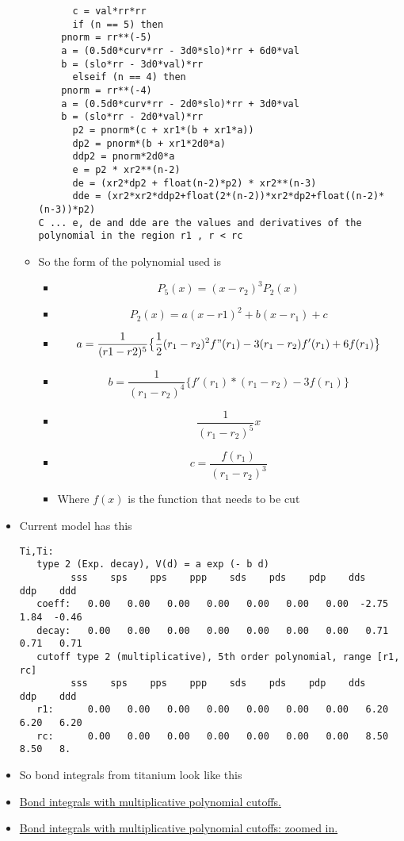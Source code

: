 \documentclass[11pt]{article}
\begin{document}
\begin{itemize}
\begin{itemize}
\begin{verbatim}
      c = val*rr*rr
      if (n == 5) then
	pnorm = rr**(-5)
	a = (0.5d0*curv*rr - 3d0*slo)*rr + 6d0*val
	b = (slo*rr - 3d0*val)*rr
      elseif (n == 4) then
	pnorm = rr**(-4)
	a = (0.5d0*curv*rr - 2d0*slo)*rr + 3d0*val
	b = (slo*rr - 2d0*val)*rr
      p2 = pnorm*(c + xr1*(b + xr1*a))
      dp2 = pnorm*(b + xr1*2d0*a)
      ddp2 = pnorm*2d0*a
      e = p2 * xr2**(n-2)
      de = (xr2*dp2 + float(n-2)*p2) * xr2**(n-3)
      dde = (xr2*xr2*ddp2+float(2*(n-2))*xr2*dp2+float((n-2)*(n-3))*p2)
C ... e, de and dde are the values and derivatives of the polynomial in the region r1 , r < rc
\end{verbatim}
\item So the form of the polynomial used is
\begin{itemize}
\item $$ P_5(x) = (x-r_2)^3 P_2(x)  $$
\item \[ P_2(x) = a(x-r1)^2 + b(x-r_1) + c \]
\item \[ a = \frac{1}{ (r1-r2)^5 } \big\{  \frac{1}{2}(r_1-r_2)^2f"(r_1) -3(r_1-r_2)f'(r_1) + 6f(r_1) \big\} \]
\item \[  b = \frac{1}{(r_1-r_2)^4} \big\{ f'(r_1)*(r_1-r_2) - 3f(r_1) \big\}  \]
\item \[ \frac{1}{(r_1 - r_2)^5} x \]
\item \[  c = \frac{ f(r_1) }{ (r_1-r_2)^3} \]
\item Where $f(x)$ is the function that needs to be cut
\end{itemize}
\end{itemize}
\item Current model has this
\begin{verbatim}
Ti,Ti:
   type 2 (Exp. decay), V(d) = a exp (- b d)
	     sss    sps    pps    ppp    sds    pds    pdp    dds    ddp    ddd
   coeff:   0.00   0.00   0.00   0.00   0.00   0.00   0.00  -2.75   1.84  -0.46
   decay:   0.00   0.00   0.00   0.00   0.00   0.00   0.00   0.71   0.71   0.71
   cutoff type 2 (multiplicative), 5th order polynomial, range [r1, rc]
	     sss    sps    pps    ppp    sds    pds    pdp    dds    ddp    ddd
   r1:      0.00   0.00   0.00   0.00   0.00   0.00   0.00   6.20   6.20   6.20
   rc:      0.00   0.00   0.00   0.00   0.00   0.00   0.00   8.50   8.50   8.
\end{verbatim}
\item So bond integrals from titanium look like this
\item \href{file:///home/tigany/Documents/ti/complete_titanium/ti_01-11-18/plot_bond_integrals/tbe_bond_integrals_with_polynomial_cutoffs_multiplicative_alt.png}{Bond integrals with multiplicative polynomial cutoffs. }
\item \href{file:///home/tigany/Documents/ti/complete_titanium/ti_01-11-18/plot_bond_integrals/tbe_bond_integrals_with_polynomial_cutoffs_multiplicative_zoomed_in.png}{Bond integrals with multiplicative polynomial cutoffs: zoomed in.}
\end{itemize}
\end{document}
